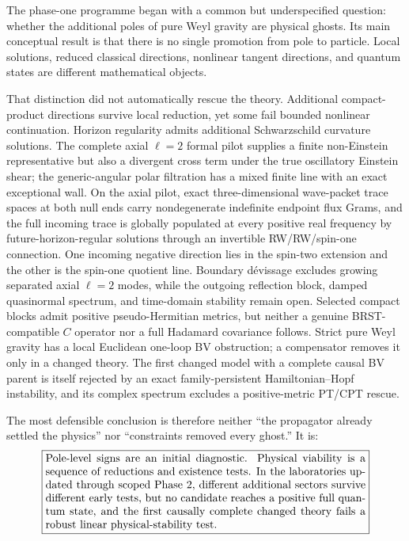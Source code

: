 \documentclass[11pt]{article}
\begin{document}
The phase-one programme began with a common but underspecified question:
whether the additional poles of pure Weyl gravity are physical ghosts.  Its
main conceptual result is that there is no single promotion from pole to
particle.  Local solutions, reduced classical directions, nonlinear tangent
directions, and quantum states are different mathematical objects.

That distinction did not automatically rescue the theory.  Additional
compact-product directions survive local reduction, yet some fail bounded
nonlinear continuation.  Horizon regularity admits additional Schwarzschild
curvature solutions.  The complete axial $\ell=2$ formal pilot supplies a
finite non-Einstein representative but also a divergent cross term under the
true oscillatory Einstein shear; the generic-angular polar filtration has a
mixed finite line with an exact exceptional wall.  On the axial pilot, exact
three-dimensional wave-packet trace spaces at both null ends carry
nondegenerate indefinite endpoint flux Grams, and the full incoming trace is
globally populated at every positive real frequency by future-horizon-regular
solutions through an invertible RW/RW/spin-one connection.  One incoming
negative direction lies in the spin-two extension and the other is the
spin-one quotient line.  Boundary d\'evissage excludes growing separated
axial \(\ell=2\) modes, while the outgoing reflection block, damped
quasinormal spectrum, and time-domain stability remain open.
Selected compact blocks
admit positive pseudo-Hermitian metrics, but neither a genuine
BRST-compatible $C$ operator nor a full Hadamard covariance follows.  Strict
pure Weyl gravity has a local Euclidean one-loop BV obstruction; a compensator
removes it only in a changed theory.  The first changed model with a complete
causal BV parent is itself rejected by an exact family-persistent
Hamiltonian--Hopf instability, and its complex spectrum excludes a
positive-metric PT/CPT rescue.

The most defensible conclusion is therefore neither ``the propagator already
settled the physics'' nor ``constraints removed every ghost.''  It is:
\begin{equation}
\boxed{
\begin{minipage}{0.84\textwidth}
Pole-level signs are an initial diagnostic.  Physical viability is a sequence
of reductions and existence tests.  In the laboratories updated through
scoped Phase 2, different additional sectors survive different early tests, but no
candidate reaches a positive full quantum state, and the first causally
complete changed theory fails a robust linear physical-stability test.
\end{minipage}}
\end{equation}
\end{document}
